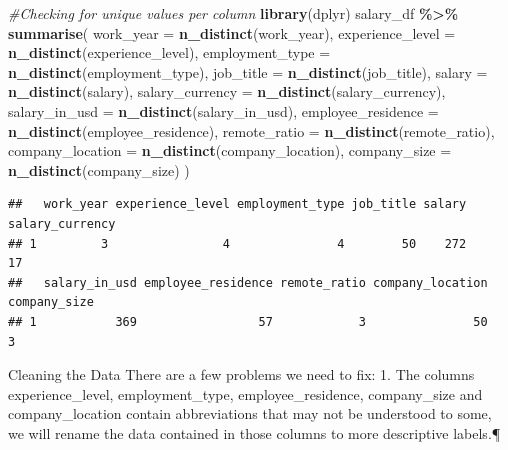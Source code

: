 \documentclass[
]{article}
\newenvironment{Shaded}{\begin{snugshade}}{\end{snugshade}}
\newcommand{\AttributeTok}[1]{\textcolor[rgb]{0.13,0.29,0.53}{#1}}
\newcommand{\CommentTok}[1]{\textcolor[rgb]{0.56,0.35,0.01}{\textit{#1}}}
\newcommand{\FunctionTok}[1]{\textcolor[rgb]{0.13,0.29,0.53}{\textbf{#1}}}
\newcommand{\NormalTok}[1]{#1}
\newcommand{\SpecialCharTok}[1]{\textcolor[rgb]{0.81,0.36,0.00}{\textbf{#1}}}
\begin{document}
\begin{Shaded}
\begin{Highlighting}[]
\CommentTok{\#Checking for unique values per column}
\FunctionTok{library}\NormalTok{(dplyr)}
\NormalTok{salary\_df }\SpecialCharTok{\%\textgreater{}\%} 
  \FunctionTok{summarise}\NormalTok{(}
    \AttributeTok{work\_year =} \FunctionTok{n\_distinct}\NormalTok{(work\_year),}
    \AttributeTok{experience\_level =} \FunctionTok{n\_distinct}\NormalTok{(experience\_level),}
    \AttributeTok{employment\_type =} \FunctionTok{n\_distinct}\NormalTok{(employment\_type),}
    \AttributeTok{job\_title =} \FunctionTok{n\_distinct}\NormalTok{(job\_title),}
    \AttributeTok{salary =} \FunctionTok{n\_distinct}\NormalTok{(salary),}
    \AttributeTok{salary\_currency =} \FunctionTok{n\_distinct}\NormalTok{(salary\_currency),}
    \AttributeTok{salary\_in\_usd =} \FunctionTok{n\_distinct}\NormalTok{(salary\_in\_usd),}
    \AttributeTok{employee\_residence =} \FunctionTok{n\_distinct}\NormalTok{(employee\_residence),}
    \AttributeTok{remote\_ratio =} \FunctionTok{n\_distinct}\NormalTok{(remote\_ratio),}
    \AttributeTok{company\_location =} \FunctionTok{n\_distinct}\NormalTok{(company\_location),}
    \AttributeTok{company\_size =} \FunctionTok{n\_distinct}\NormalTok{(company\_size)}
\NormalTok{  )}
\end{Highlighting}
\end{Shaded}

\begin{verbatim}
##   work_year experience_level employment_type job_title salary salary_currency
## 1         3                4               4        50    272              17
##   salary_in_usd employee_residence remote_ratio company_location company_size
## 1           369                 57            3               50            3
\end{verbatim}

Cleaning the Data There are a few problems we need to fix: 1. The
columns experience\_level, employment\_type, employee\_residence,
company\_size and company\_location contain abbreviations that may not
be understood to some, we will rename the data contained in those
columns to more descriptive labels.¶
\end{document}
